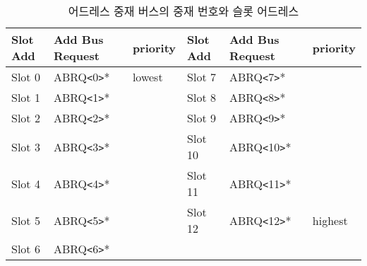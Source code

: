 %
\begin{table}[htbp]
\caption{어드레스 중재 버스의 중재 번호와 슬롯 어드레스}\label{table:abrq-signal}
   \begin{center}
   \begin{tabular}{|l|l|l||l|l|l|} \hline
      Slot Add & Add Bus Request & priority &
      Slot Add & Add Bus Request & priority \\ \hline \hline
      Slot 0 & ABRQ{\tt <}0{\tt >}* & lowest &
      Slot 7 & ABRQ{\tt <}7{\tt >}* & \  \\ \hline
      Slot 1 & ABRQ{\tt <}1{\tt >}* & \  &
      Slot 8 & ABRQ{\tt <}8{\tt >}* & \  \\ \hline
      Slot 2 & ABRQ{\tt <}2{\tt >}* & \  &
      Slot 9 & ABRQ{\tt <}9{\tt >}* & \  \\ \hline
      Slot 3 & ABRQ{\tt <}3{\tt >}* & \  &
      Slot 10 & ABRQ{\tt <}10{\tt >}* & \  \\ \hline
      Slot 4 & ABRQ{\tt <}4{\tt >}* & \  &
      Slot 11 & ABRQ{\tt <}11{\tt >}* & \  \\ \hline
      Slot 5 & ABRQ{\tt <}5{\tt >}* & \  &
      Slot 12 & ABRQ{\tt <}12{\tt >}* & highest \\ \hline
      Slot 6 & ABRQ{\tt <}6{\tt >}* & \  &
      \  & \  & \  \\ \hline
   \end{tabular}
   \end{center}
\end{table}
%

